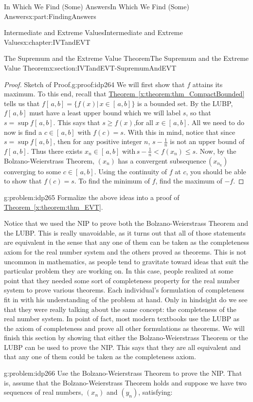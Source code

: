 \documentclass[oneside,10pt,]{book}
\newcommand{\xreffont}{\relax}
\numberwithin{equation}{section}
\newcommand{\lt}{<}
\begin{document}
\begin{partptx}{In Which We Find (Some) Answers}{}{In Which We Find (Some) Answers}{}{}{x:part:FindingAnswers}
\begin{chapterptx}{Intermediate and Extreme Values}{}{Intermediate and Extreme Values}{}{}{x:chapter:IVTandEVT}
\begin{sectionptx}{The Supremum and the Extreme Value Theorem}{}{The Supremum and the Extreme Value Theorem}{}{}{x:section:IVTandEVT-SupremumAndEVT}
\begin{proof}{Sketch of Proof.}{g:proof:idp264}
We will first show that \(f\) attains its maximum. To this end, recall that \hyperref[x:theorem:thm_CompactBounded]{Theorem~{\xreffont\ref{x:theorem:thm_CompactBounded}}} tells us that \(f[\,a,b]=\{f(x)|\,x\in[\,a,b]\}\) is a bounded set. By the LUBP, \(f[\,a,b]\) must have a least upper bound which we will label \(s\), so that \(s=\sup f[\,a,b]\). This says that \(s\geq f(x)\),for all \(x\in[\,a,b]\). All we need to do now is find a \(c\in[\,a,b]\) with \(f(c)=s\). With this in mind, notice that since \(s=\sup f[\,a,b]\), then for any positive integer \(n\), \(s-\frac{1}{n}\) is not an upper bound of \(f[\,a,b]\). Thus there exists \(x_n\in[\,a,b]\) with\(\,s-\frac{1}{n}\lt f(x_n)\leq s\). Now, by the Bolzano-Weierstrass Theorem, \(\left(x_n\right)\) has a convergent subsequence\(\,\left(x_{n_k}\right)\) converging to some \(c\in[\,a,b]\). Using the continuity of \(f\) at \(c\), you should be able to show that \(f(c)=s\). To find the minimum of \(f\), find the maximum of \(-f\).%
\end{proof}
\begin{problem}{}{g:problem:idp265}%
 Formalize the above ideas into a proof of \hyperref[x:theorem:thm_EVT]{Theorem~{\xreffont\ref{x:theorem:thm_EVT}}}.%
\end{problem}
Notice that we used the NIP to prove both the Bolzano-Weierstrass Theorem and the LUBP. This is really unavoidable, as it turns out that all of those statements are equivalent in the sense that any one of them can be taken as the completeness axiom for the real number system and the others proved as theorems. This is not uncommon in mathematics, as people tend to gravitate toward ideas that suit the particular problem they are working on. In this case, people realized at some point that they needed some sort of completeness property for the real number system to prove various theorems. Each individual's formulation of completeness fit in with his understanding of the problem at hand. Only in hindsight do we see that they were really talking about the same concept: the completeness of the real number system. In point of fact, most modern textbooks use the LUBP as the axiom of completeness and prove all other formulations as theorems. We will finish this section by showing that either the Bolzano-Weierstrass Theorem or the LUBP can be used to prove the NIP. This says that they are all equivalent and that any one of them could be taken as the completeness axiom.%
\begin{problem}{}{g:problem:idp266}%
 Use the Bolzano-Weierstrass Theorem to prove the NIP. That is, assume that the Bolzano-Weierstrass Theorem holds and suppose we have two sequences of real numbers, \(\left(x_n\right)\) and \(\left(y_n\right)\), satisfying:%

\end{problem}
\end{sectionptx}
\end{chapterptx}
\end{partptx}
\end{document}
